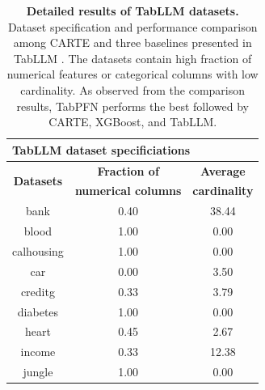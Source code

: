 \documentclass{article}
\theoremstyle{plain}
\theoremstyle{definition}
\theoremstyle{remark}
\begin{document}
\begin{table}[!p]
\small%
\begin{center}
\caption{\textbf{Detailed results of TabLLM datasets.} Dataset specification and performance comparison among CARTE and three baselines presented in TabLLM \citep{hegselmannTabLLMFewshotClassification2023}. The datasets contain high fraction of numerical features or categorical columns with low cardinality. As observed from the comparison results, TabPFN performs the best followed by CARTE, XGBoost, and TabLLM.
\label{tab:tabllm}
}
\vspace{0.1in}
\begin{tabular}{ccc}
\multicolumn{3}{l}{\hspace{-0.7em}\textbf{TabLLM dataset specificiations}\vspace{1mm}}\\%
\toprule
\multicolumn{1}{c}{\multirow{2}{*}{\textbf{Datasets}}} & \multicolumn{1}{c}{\textbf{Fraction of}} & \multicolumn{1}{c}{\textbf{Average}} \\
& \multicolumn{1}{c}{\textbf{numerical columns}} & \multicolumn{1}{c}{\textbf{cardinality}} \\
\midrule
bank        & 0.40 & 38.44 \\
blood       & 1.00 & 0.00  \\
calhousing  & 1.00 & 0.00  \\
car         & 0.00 & 3.50  \\
creditg     & 0.33 & 3.79  \\
diabetes    & 1.00 & 0.00  \\
heart       & 0.45 & 2.67  \\
income      & 0.33 & 12.38 \\
jungle      & 1.00 & 0.00  \\
\bottomrule
\end{tabular}

\vspace{1mm}


\end{center}
\end{table}
\end{document}
